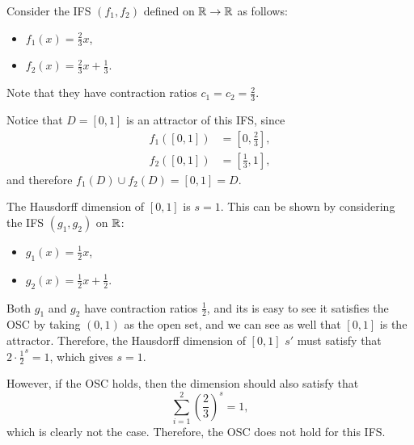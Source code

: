 Consider the IFS \((f_1, f_2)\) defined on \(\mathbb{R} \to \mathbb{R}\) as follows:
\begin{itemize}
    \item \(f_1(x) = \frac{2}{3}x\),
    \item \(f_2(x) = \frac{2}{3}x + \frac{1}{3}\).
\end{itemize}

Note that they have contraction ratios \(c_1 = c_2 = \frac{2}{3}\).

Notice that \(D = [0, 1]\) is an attractor of this IFS, since
\begin{align*}
f_1([0, 1]) &= \left[0, \frac{2}{3}\right],\\
f_2([0, 1]) &= \left[\frac{1}{3}, 1\right],
\end{align*}
and therefore \(f_1(D) \cup f_2(D) = [0, 1] = D\).

The Hausdorff dimension of \([0, 1]\) is \(s = 1\). This can be shown by considering the IFS \((g_1, g_2)\) on \(\mathbb{R}\):
\begin{itemize}
    \item \(g_1(x) = \frac{1}{2}x\),
    \item \(g_2(x) = \frac{1}{2} x + \frac{1}{2}\).
\end{itemize}

Both \(g_1\) and \(g_2\) have contraction ratios \(\frac{1}{2}\), and its is easy to see it satisfies the OSC by taking \((0, 1)\) as the open set, and we can see as well that \([0, 1]\) is the attractor. Therefore, the Hausdorff dimension of \([0, 1]\) \(s'\) must satisfy that \(2 \cdot \frac{1}{2}^s = 1\), which gives \(s = 1\).

However, if the OSC holds, then the dimension should also satisfy that
\[
\sum_{i = 1}^{2} \left(\frac{2}{3}\right)^s = 1,
\]
which is clearly not the case. Therefore, the OSC does not hold for this IFS.